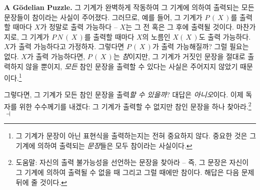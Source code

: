 \documentclass[12pt]{paper}
\newenvironment{context}[1][]
{ \noindent \textbf{{#1}.} }
{ \hfill $ \dashv $ }
\begin{document}
\begin{context}[A G\"odelian Puzzle]
그 기계가 완벽하게 작동하여 그 기계에 의하여 출력되는 모든 문장들이 참이라는 사실이 주어졌다.
그러므로, 예를 들어, 그 기계가 $P \, \left( \, X \, \right)$를 출력할 때마다 $X$가 정말로 출력 가능하다 --
$X$는 그 전 혹은 그 후에 출력될 것이다.
마찬가지로, 그 기계가 $P \, N \, \left( \, X \, \right)$를 출력할 때마다 $X$의 노름인 $X \left( \, X \, \right)$도 출력 가능하다.
$X$가 출력 가능하다고 가정하자.
그렇다면 $P \, \left( \, X \, \right)$가 출력 가능해질까?
그럴 필요는 없다.
$X$가 출력 가능하다면, $P \, \left( \, X \, \right)$는 \textit{참}이지만,
그 기계가 거짓인 문장을 절대로 출력하지 않을 뿐이지,
\textit{모든} 참인 문장을 출력할 수 있다는 사실은 주어지지 않았기 때문이다.\footnote
{
그 기계가 문장이 아닌 표현식을 출력하는지는 전혀 중요하지 않다.
중요한 것은 그 기계에 의하여 출력되는 \textit{문장}들은 모두 참이라는 사실이다.
}

그렇다면, 그 기계가 모든 참인 문장을 출력\textit{할 수 있을까}?
대답은 \textit{아니오}이다.
이제 독자를 위한 수수께기를 내겠다:
그 기계가 출력할 수 없지만 참인 문장을 하나 찾아라.\footnote
{
도움말: 자신의 출력 불가능성을 선언하는 문장을 찾아라 --
즉, 그 문장은 자신이 그 기계에 의하여 출력될 수 없을 때 그리고 그럴 때에만 참이다.
해답은 다음 문제 뒤에 줄 것이다.
}
\end{context}
\end{document}
